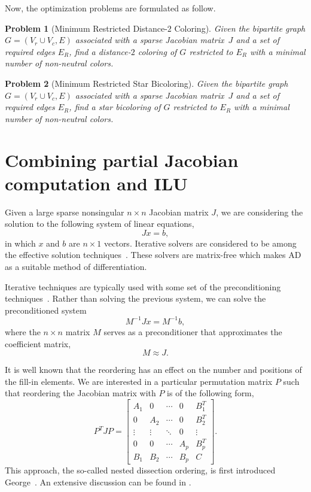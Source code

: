 \documentclass[12pt, twoside,a4paper,toc=bibliography]{scrbook}
\newtheorem{problem}{Problem}
\begin{document}
Now, the optimization problems are formulated as follow.

\begin{problem}[Minimum Restricted Distance-$2$ Coloring]
\label{p.restricted.d2} Given the bipartite graph $G=(V_r\cup V_c, E)$
associated with a sparse Jacobian
matrix~$J$ and a set of required edges $E_R$,
find a distance-$2$ coloring of $G$ restricted to $E_R$
with a minimal number of non-neutral colors.
\end{problem}

\begin{problem}[Minimum Restricted Star Bicoloring]
\label{p.restricted.star} Given the bipartite graph $G=(V_r\cup V_c, E)$
associated with a sparse Jacobian
matrix~$J$ and a set of required edges $E_R$,
find a star bicoloring of $G$ restricted to $E_R$
with a minimal number of non-neutral colors.
\end{problem}


\section{Combining partial Jacobian computation and ILU}
\label{s.precond}
Given a large sparse nonsingular $n\times n$ Jacobian matrix $J$,
we are considering the solution to the following system of linear equations,
$$
J x = b,
$$
in which $x$ and $b$ are $n\times 1$ vectors. 
Iterative solvers are considered to be among the effective solution techniques~\cite{ilu2003}.
These solvers are matrix-free which makes AD as a suitable method of differentiation.

Iterative techniques are typically used with some set of
the preconditioning techniques~\cite{precond1,ilu2003}.
Rather than solving the previous system,
we can solve the preconditioned system
\begin{equation}
\label{e:precond}
M^{-1} J x= M^{-1} b,
\end{equation}
where the $n \times n$ matrix $M$ serves as a preconditioner that approximates
the coefficient matrix,
$$M \approx J.$$

It is well known \cite{ros:gra} that the reordering has an effect on the number and positions of
the fill-in elements. We are interested in a particular permutation matrix $P$ such that
reordering the Jacobian matrix with $P$ is of the following form,
$$
P^T J P =
\begin{bmatrix}
A_1 & 0   & \cdots & 0 & B_1^T \\
0   & A_2 & \cdots & 0  & B_2^T \\
\vdots& \vdots & \ddots & 0 & \vdots \\
0   &   0 & \cdots & A_p & B_p^T \\
B_1 & B_2 & \cdots & B_p& C
\end{bmatrix} .
$$
This approach, the so-called nested dissection ordering, is first 
introduced George~\cite{nested_diss1}. An extensive discussion 
can be found in \cite{ilu_ordering4}.
\end{document}
